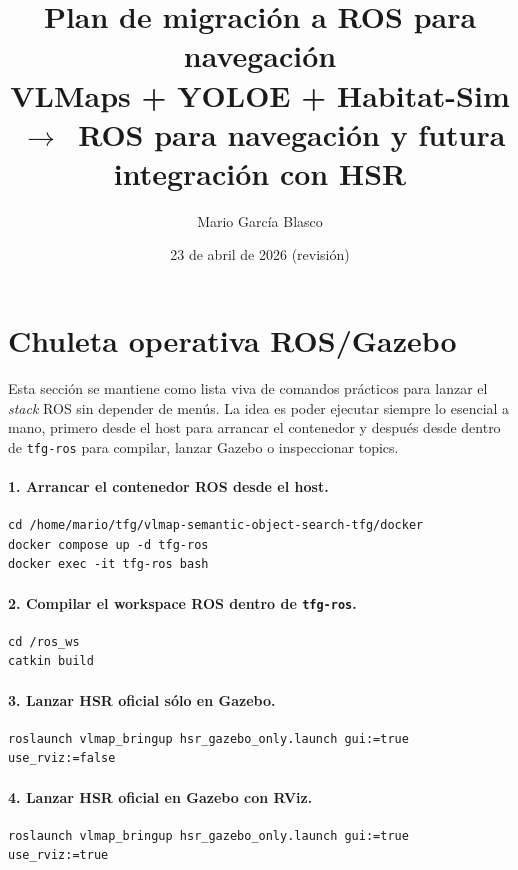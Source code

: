 \documentclass[11pt,a4paper]{article}
\title{\textbf{Plan de migración a ROS para navegación}\\[6pt]
\large VLMaps + YOLOE + Habitat-Sim \,$\rightarrow$\, ROS para navegación y futura integración con HSR}
\author{Mario García Blasco}
\date{23 de abril de 2026 (revisión)}
\begin{document}
\maketitle
\section*{Chuleta operativa ROS/Gazebo}

Esta sección se mantiene como lista viva de comandos prácticos para lanzar el
\emph{stack} ROS sin depender de menús. La idea es poder ejecutar siempre lo
esencial a mano, primero desde el host para arrancar el contenedor y después
desde dentro de \texttt{tfg-ros} para compilar, lanzar Gazebo o inspeccionar
topics.

\paragraph{1. Arrancar el contenedor ROS desde el host.}

\begin{verbatim}
cd /home/mario/tfg/vlmap-semantic-object-search-tfg/docker
docker compose up -d tfg-ros
docker exec -it tfg-ros bash
\end{verbatim}

\paragraph{2. Compilar el workspace ROS dentro de \texttt{tfg-ros}.}

\begin{verbatim}
cd /ros_ws
catkin build
\end{verbatim}

\paragraph{3. Lanzar HSR oficial sólo en Gazebo.}

\begin{verbatim}
roslaunch vlmap_bringup hsr_gazebo_only.launch gui:=true use_rviz:=false
\end{verbatim}

\paragraph{4. Lanzar HSR oficial en Gazebo con RViz.}

\begin{verbatim}
roslaunch vlmap_bringup hsr_gazebo_only.launch gui:=true use_rviz:=true
\end{verbatim}
\end{document}
